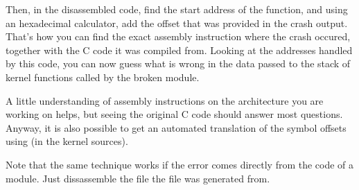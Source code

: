 Then, in the disassembled code, find the start address of the
function, and using an hexadecimal calculator, add the offset that
was provided in the crash output. That's how you can find the
exact assembly instruction where the crash occured, together
with the C code it was compiled from. Looking at the addresses
handled by this code, you can now guess what is wrong in the
data passed to the stack of kernel functions called by the
broken module.

A little understanding of assembly instructions on the architecture
you are working on helps, but seeing the original C code should answer
most questions. Anyway, it is also possible to get an automated
translation of the symbol offsets using
 (in the kernel sources).

Note that the same technique works if the error comes directly from
the code of a module. Just dissassemble the  file
the  file was generated from.
